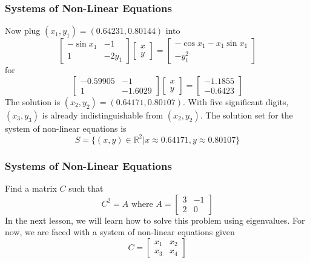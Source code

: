\documentclass[xcolor=dvipsnames]{beamer}
\begin{document}
\begin{frame}
  \frametitle{Systems of Non-Linear Equations}
  Now plug $(x_{1},y_{1})=(0.64231,0.80144)$ into
  \begin{equation}
    \label{eq:cheateeg}
    \left[
    \begin{array}{cc}
      -\sin{}x_{1}&-1 \\
                  1&-2y_{1}
    \end{array}\right]\left[
    \begin{array}{c}
      x \\
      y
    \end{array}\right]=\left[
    \begin{array}{c}
      -\cos{}x_{1}-x_{1}\sin{}x_{1} \\
      -y_{1}^{2}
    \end{array}\right]
  \end{equation}
  for
  \begin{equation}
    \label{eq:ietahsai}
    \left[
      \begin{array}{cc}
        -0.59905 & -1 \\
        1 & -1.6029
      \end{array}\right]\left[
      \begin{array}{c}
        x\\
        y
      \end{array}\right]=\left[
      \begin{array}{c}
        -1.1855 \\
        -0.6423
      \end{array}\right]
  \end{equation}
  The solution is $(x_{2},y_{2})=(0.64171,0.80107)$. With
  five significant digits, $(x_{3},y_{3})$ is already
  indistinguishable from $(x_{2},y_{2})$. The solution set for the
  system of non-linear equations is
  \begin{equation}
    \label{eq:xiepudei}
    S=\{(x,y)\in\mathbb{R}^{2}|x\approx{}0.64171,y\approx{}0.80107\}
  \end{equation}
\end{frame}

\begin{frame}
  \frametitle{Systems of Non-Linear Equations}
   Find a matrix $C$ such that
  \begin{equation}
    \label{eq:eizuchan}
    C^{2}=A\mbox{ where }A=\left[
      \begin{array}{cc}
        3&-1 \\
        2&0
      \end{array}\right]
  \end{equation}
In the next lesson, we will learn how to solve this problem using
eigenvalues. For now, we are faced with a system of non-linear
equations given
\begin{equation}
  \label{eq:xohdaihu}
  C=\left[
    \begin{array}{cc}
      x_{1}&x_{2} \\
       x_{3}&x_{4}
    \end{array}\right]
\end{equation}
\end{frame}
\end{document}
